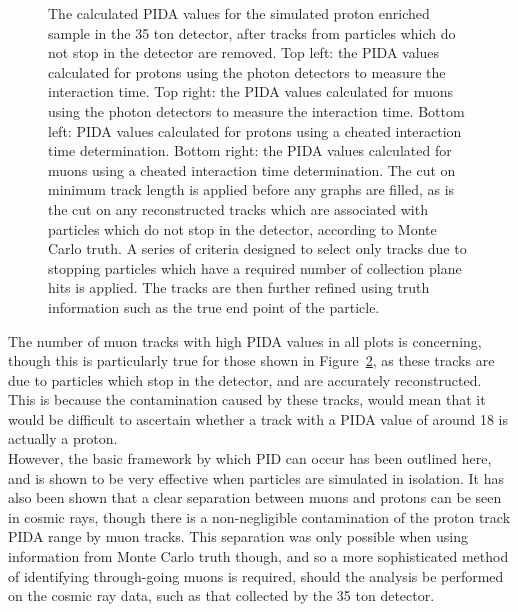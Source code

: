 \begin{figure}
\begin{subfigure}{0.48\textwidth}
        \label{fig:CRY_PIDACheat_Muon_Cheat}
  \end{subfigure}
  \caption[The calculated PIDA values for the simulated proton enriched sample in the 35 ton detector, after tracks from particles which do not stop in the detector are removed]
          {The calculated PIDA values for the simulated proton enriched sample in the 35 ton detector, after tracks from particles which do not stop in the detector are removed. Top left: the PIDA values calculated for protons using the photon detectors to measure the interaction time. Top right: the PIDA values calculated for muons using the photon detectors to measure the interaction time. Bottom left: PIDA values calculated for protons using a cheated interaction time determination. Bottom right: the PIDA values calculated for muons using a cheated interaction time determination. The cut on minimum track length is applied before any graphs are filled, as is the cut on any reconstructed tracks which are associated with particles which do not stop in the detector, according to Monte Carlo truth. A series of criteria designed to select only tracks due to stopping particles which have a required number of collection plane hits is applied. The tracks are then further refined using truth information such as the true end point of the particle.}
  \label{fig:CRY_PIDACheat}
\end{figure}

The number of muon tracks with high PIDA values in all plots is concerning, though this is particularly true for those shown in Figure~\ref{fig:CRY_PIDACheat}, as these tracks are due to particles which stop in the detector, and are accurately reconstructed. This is because the contamination caused by these tracks, would mean that it would be difficult to ascertain whether a track with a PIDA value of around 18 is actually a proton. \\

However, the basic framework by which PID can occur has been outlined here, and is shown to be very effective when particles are simulated in isolation. It has also been shown that a clear separation between muons and protons can be seen in cosmic rays, though there is a non-negligible contamination of the proton track PIDA range by muon tracks. This separation was only possible when using information from Monte Carlo truth though, and so a more sophisticated method of identifying through-going muons is required, should the analysis be performed on the cosmic ray data, such as that collected by the 35 ton detector. \\

